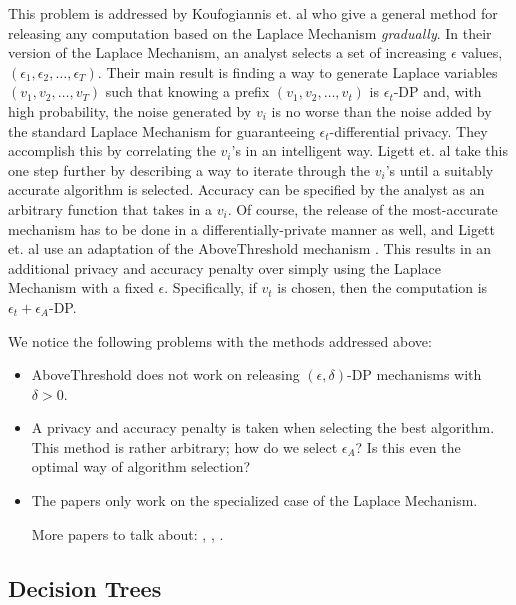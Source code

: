 \documentclass[11pt]{article}
\begin{document}
This problem is addressed by Koufogiannis et. al \cite{Koufogiannis:2015} who give a general method for releasing any computation based on the Laplace Mechanism \emph{gradually}. In their version of the Laplace Mechanism, an analyst selects a set of increasing $\epsilon$ values, $(\epsilon_1, \epsilon_2, \ldots, \epsilon_T)$. Their main result is finding a way to generate Laplace variables $(v_1, v_2, \ldots, v_T)$ such that knowing a prefix $(v_1, v_2, \ldots, v_t)$ is $\epsilon_t$-DP and, with high probability, the noise generated by $v_i$ is no worse than the noise added by the standard Laplace Mechanism for guaranteeing $\epsilon_t$-differential privacy. They accomplish this by correlating the $v_i$'s in an intelligent way. Ligett et. al \cite{Ligett:2017} take this one step further by describing a way to iterate through the $v_i$'s until a suitably accurate algorithm is selected. Accuracy can be specified by the analyst as an arbitrary function that takes in a $v_i$. Of course, the release of the most-accurate mechanism has to be done in a differentially-private manner as well, and Ligett et. al use an adaptation of the AboveThreshold mechanism \cite{Dwork:2006}. This results in an additional privacy and accuracy penalty over simply using the Laplace Mechanism with a fixed $\epsilon$. Specifically, if $v_t$ is chosen, then the computation is $\epsilon_t+\epsilon_A$-DP.

We notice the following problems with the methods addressed above:
\begin{itemize}
\item AboveThreshold does not work on releasing $(\epsilon, \delta)$-DP mechanisms with $\delta > 0$.
\item A privacy and accuracy penalty is taken when selecting the best algorithm. This method is rather arbitrary; how do we select $\epsilon_A$? Is this even the optimal way of algorithm selection?
\item The papers only work on the specialized case of the Laplace Mechanism.

More papers to talk about: \cite{Winograd-Cort:2017}, \cite{Liu:2018}, \cite{Hsu:2014}.
\end{itemize}
\subsection{Decision Trees}
\end{document}
